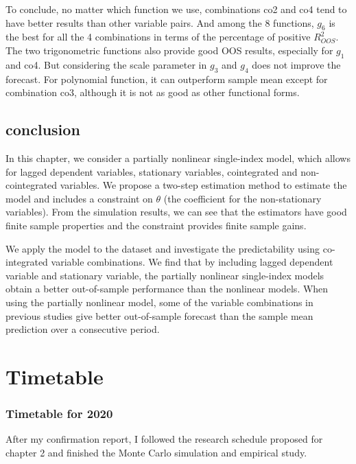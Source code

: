 \documentclass[a4paper,12pt,times,numbered,print,index]{report}
\numberwithin{equation}{section}
\begin{document}
	To conclude, no matter which function we use, combinations co2 and co4 tend to have better results than other variable pairs. And among the 8 functions, $g_6$ is the best for all the 4 combinations in terms of the percentage of positive $R^2_{OOS}$. The two trigonometric functions also provide good OOS results, especially for $g_1$ and co4. But considering the scale parameter in $g_3$ and $g_4$ does not improve the forecast. For polynomial function, it can outperform sample mean except for combination co3, although it is not as good as other functional forms.
	
	\section{conclusion}
	In this chapter, we consider a partially nonlinear single-index model, which allows for lagged dependent variables, stationary variables, cointegrated and non-cointegrated variables. We propose a two-step estimation method to estimate the model and includes a constraint on $\theta$ (the coefficient for the non-stationary variables). From the simulation results, we can see that the estimators have good finite sample properties and the constraint provides finite sample gains. 
	
	We apply the model to the \cite{welch2008comprehensive} dataset and investigate the predictability using co-integrated variable combinations. We find that by including lagged dependent variable and stationary variable, the partially nonlinear single-index models obtain a better out-of-sample performance than the nonlinear models. When using the partially nonlinear model, some of the variable combinations in previous studies give better out-of-sample forecast than the sample mean prediction over a consecutive period. 
	
	\chapter*{Timetable}
	\subsection*{Timetable for 2020}
	After my confirmation report, I followed the research schedule proposed for chapter 2 and finished the Monte Carlo simulation and empirical study.
	
\end{document}
